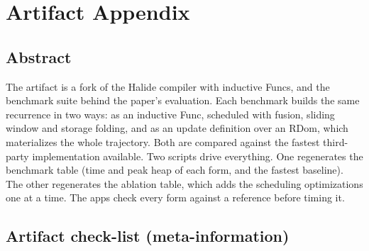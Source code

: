 %
\providecommand{\artifactdoi}{\textit{(Zenodo DOI)}}
\providecommand{\artifactrepo}{\url{https://github.com/wraith1995/Halide/tree/inductive_artifact}}
\providecommand{\papertable}{the benchmark table}
\providecommand{\paperablation}{the ablation table}

\section{Artifact Appendix}

\subsection{Abstract}

The artifact is a fork of the Halide compiler with inductive Funcs, and the
benchmark suite behind the paper's evaluation. Each benchmark builds the same
recurrence in two ways: as an inductive Func, scheduled with fusion, sliding
window and storage folding, and as an update definition over an RDom, which
materializes the whole trajectory. Both are compared against the fastest
third-party implementation available. Two scripts drive everything. One
regenerates \papertable{} (time and peak heap of each form, and the fastest
baseline). The other regenerates \paperablation{}, which adds the scheduling
optimizations one at a time. The apps check every form against a reference
before timing it.

\subsection{Artifact check-list (meta-information)}


